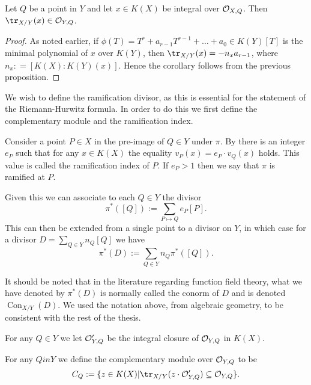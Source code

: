     \begin{cor}\label{traceinclosure}
    Let $Q$ be a point in $Y$ and let $x\in K(X)$ be integral over ${\cal O}_{X,Q}$.
    Then $\tr_{X/Y}(x)\in \cO_{Y,Q}$.
    \end{cor}
    \begin{proof}
    As noted earlier, if $\phi(T)=T^r+a_{r-1}T^{r-1} + \ldots + a_0\in K(Y)[T]$ is the minimal polynomial of $x$ over $K(Y)$, then $\tr_{X/Y}(x)=-n_xa_{r-1}$, where $n_x : = [K(X):K(Y)(x)]$.
    Hence the corollary follows from the previous proposition.
    \end{proof}


We wish to define the ramification divisor, as this is essential for the statement of the Riemann-Hurwitz formula.
In order to do this we first define the complementary module and the ramification index.


    \begin{defn}
    Consider a point $P\in X$ in the pre-image of $Q\in Y$ under $\pi$.
    By \cite[Prop. 3.1.4]{stichtenoth} there is an integer $e_P$ such that for any $x\in K(X)$ the equality $v_P(x) = e_P\cdot v_Q(x)$ holds.
    This value is called the ramification index of $P$.
    If $e_P>1$ then we say that $\pi$ is ramified at $P$.
    \end{defn}

Given this we can associate to each $Q\in Y$ the divisor
    \[
    \pi^*([Q]) := \sum_{P\mapsto Q} e_P [P].
    \]
This can then be extended from a single point to a divisor on $Y$, in which case for a divisor $D = \sum_{Q\in Y}n_Q [Q]$ we have
    \[
    \pi^*(D) := \sum_{Q\in Y}n_Q \pi^*([Q]).
    \]

    \begin{rem}
    It should be noted that in the literature regarding function field theory, what we have denoted by $\pi^*(D)$ is normally called the conorm of $D$ and is denoted $\operatorname{Con}_{X/Y}(D)$. 
    We used the notation above, from algebraic geometry, to be consistent with the rest of the thesis.
    \end{rem}

    For any $Q\in Y$ we let ${\cal O}_{Y,Q}'$ be the integral closure of ${\cal O}_{Y,Q}$ in $K(X)$.

    \begin{defn}
    For any $Q in Y$ we define the complementary module over ${\cal O}_{Y,Q}$ to be
        \[
        C_Q :=\{z\in K(X) | \tr_{X/Y}(z\cdot \cO_{Y,Q}') \subseteq \cO_{Y,Q}\}.
        \]
    \end{defn}


